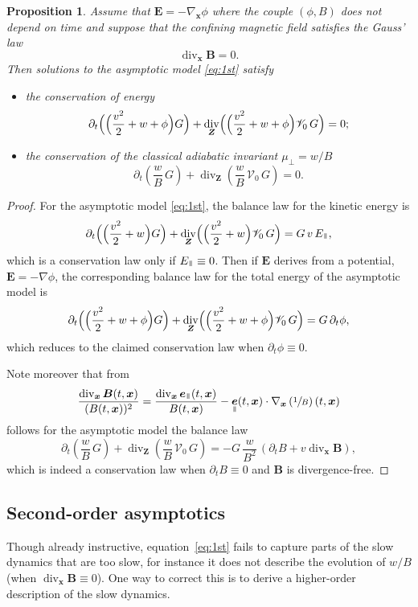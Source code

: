 \documentclass[10pt]{amsart}
\let\mathcal\mathscr
\newcommand{\sperp}{{\scriptscriptstyle\perp}}
\let\d\partial
\DeclareMathOperator{\Div}{div}
\theoremstyle{plain}
\newtheorem{proposition}[theorem]{Proposition}
\theoremstyle{definition}
\newcommand{\bpr}{\begin{proposition}}
\newcommand{\epr}{\end{proposition}}
\newcommand\bB{{\boldsymbol B}}
\newcommand\bE{{\boldsymbol E}}
\newcommand\bfx{{\boldsymbol x}}
\newcommand\bfZ{{\boldsymbol Z}}
\newcommand\cV{{\mathcal V}}
\DeclareMathOperator{\beD}{\boldsymbol{e}}
\newcommand\eDpar{\beD_\mypar}
\let\e w
\newcommand\Epar{E_\mypar}
\newcommand{\mypar}{{\mkern3mu\vphantom{\perp}\vrule depth 0pt\mkern2mu\vrule depth 0pt\mkern3mu}}
\begin{document}
\bpr
\label{prop:cons1}
Assume that $\bE=-\nabla_\bfx\phi$ where the couple $(\phi,B)$ does not depend on time and suppose that the confining magnetic field satisfies the Gauss' law
\[
\Div_\bfx\bB= 0.
\]
Then solutions to the asymptotic model \eqref{eq:1st} satisfy
\begin{itemize}
\item the conservation of energy
\[
\d_t \Bigl(\Bigl(\frac{v^2}{2}+\e+\phi\Bigr)G\Bigr)+\Div_{\bfZ} \Bigl(\Bigl(\frac{v^2}{2}+\e+\phi\Bigr)\cV_0\, G\Bigr)
=0;
\]
\item the conservation of the classical adiabatic invariant $\mu_\sperp=\e/B$
\[
\d_t \left(\frac{\e}{B}\,G\right)+\Div_{\bfZ} \left(\frac{\e}{B}\,\cV_0\,G\right)
= 0.
\]
\end{itemize}
\epr
\begin{proof}
For the asymptotic model \eqref{eq:1st}, the balance law for the kinetic energy is
\[
\d_t \Bigl(\Bigl(\frac{v^2}{2}+\e\Bigr)G\Bigr)+\Div_{\bfZ} \Bigl(\Bigl(\frac{v^2}{2}+\e\Bigr)\cV_0\, G\Bigr)
= G\,v\,\Epar,
\]
which is a conservation law only if $\Epar\equiv0$. Then if $\bE$ derives from a potential, $\bE=-\nabla\phi$, the corresponding balance law for the total energy of the asymptotic model is
\[
\d_t \Bigl(\Bigl(\frac{v^2}{2}+\e+\phi\Bigr)G\Bigr)+\Div_{\bfZ} \Bigl(\Bigl(\frac{v^2}{2}+\e+\phi\Bigr) \cV_0\, G\Bigr)
= G\,\d_t\phi,
\]
which reduces to the claimed conservation law when $\d_t\phi\equiv0$.

Note moreover that from
\[
\frac{\Div_\bfx\bB(t,\bfx)}{(B(t,\bfx))^2}=
\frac{\Div_\bfx\eDpar(t,\bfx)}{B(t,\bfx)}
-\eDpar(t,\bfx)\cdot\nabla_\bfx\left(\sfrac1B\right)(t,\bfx)
\]
follows for the asymptotic model the balance law
\[
\d_t \left(\frac{\e}{B}\,G\right)+\Div_{\bfZ} \left(\frac{\e}{B}\,\cV_0\, G\right)
=-G\,\frac{\e}{B^2}\,(\d_tB+v\Div_\bfx\bB),
\]
which is indeed a conservation law when $\d_tB\equiv0$ and $\bB$ is divergence-free.
\end{proof}

\subsection{Second-order asymptotics}

Though already instructive, equation~\eqref{eq:1st} fails to capture parts of the slow dynamics that are too slow, for instance it does not describe the evolution of $\e/B$ (when $\Div_\bfx\bB\equiv0$). One way to correct this is to derive a higher-order description of the slow dynamics.
\end{document}
